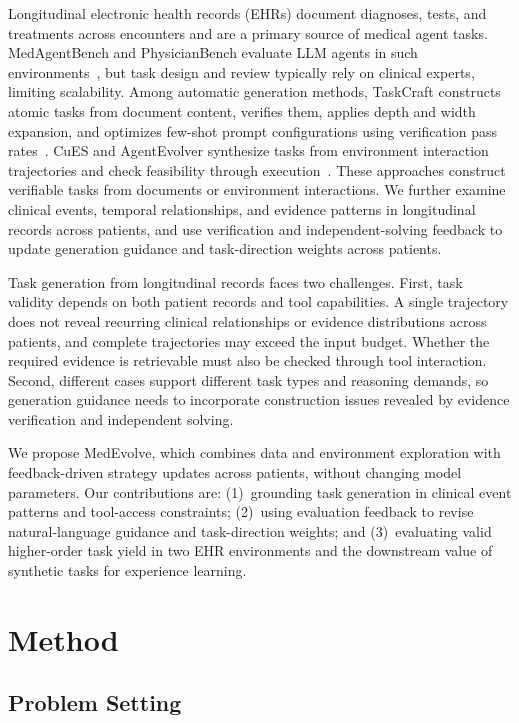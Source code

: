\documentclass[11pt]{article}
\begin{document}
Longitudinal electronic health records (EHRs) document diagnoses, tests, and treatments across encounters and are a primary source of medical agent tasks. MedAgentBench and PhysicianBench evaluate LLM agents in such environments~\citep{jiang2025medagentbench,liu2026physicianbench}, but task design and review typically rely on clinical experts, limiting scalability. Among automatic generation methods, TaskCraft constructs atomic tasks from document content, verifies them, applies depth and width expansion, and optimizes few-shot prompt configurations using verification pass rates~\citep{shi2025taskcraft}. CuES and AgentEvolver synthesize tasks from environment interaction trajectories and check feasibility through execution~\citep{mai2025cues,zhai2025agentevolver}. These approaches construct verifiable tasks from documents or environment interactions. We further examine clinical events, temporal relationships, and evidence patterns in longitudinal records across patients, and use verification and independent-solving feedback to update generation guidance and task-direction weights across patients.

Task generation from longitudinal records faces two challenges. First, task validity depends on both patient records and tool capabilities. A single trajectory does not reveal recurring clinical relationships or evidence distributions across patients, and complete trajectories may exceed the input budget. Whether the required evidence is retrievable must also be checked through tool interaction. Second, different cases support different task types and reasoning demands, so generation guidance needs to incorporate construction issues revealed by evidence verification and independent solving.

We propose MedEvolve, which combines data and environment exploration with feedback-driven strategy updates across patients, without changing model parameters. Our contributions are: (1)~grounding task generation in clinical event patterns and tool-access constraints; (2)~using evaluation feedback to revise natural-language guidance and task-direction weights; and (3)~evaluating valid higher-order task yield in two EHR environments and the downstream value of synthetic tasks for experience learning.

\section{Method}

\subsection{Problem Setting}
\end{document}
